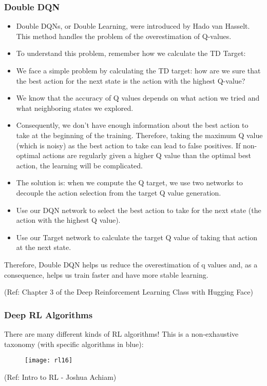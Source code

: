 \begin{frame}[fragile]\frametitle{Double DQN}


\begin{itemize}
\item Double DQNs, or Double Learning, were introduced by Hado van Hasselt. This method handles the problem of the overestimation of Q-values.
\item To understand this problem, remember how we calculate the TD Target:
\item We face a simple problem by calculating the TD target: how are we sure that the best action for the next state is the action with the highest Q-value?
\item We know that the accuracy of Q values depends on what action we tried and what neighboring states we explored.
\item Consequently, we don’t have enough information about the best action to take at the beginning of the training. Therefore, taking the maximum Q value (which is noisy) as the best action to take can lead to false positives. If non-optimal actions are regularly given a higher Q value than the optimal best action, the learning will be complicated.
\item The solution is: when we compute the Q target, we use two networks to decouple the action selection from the target Q value generation. 
\item Use our DQN network to select the best action to take for the next state (the action with the highest Q value).
\item Use our Target network to calculate the target Q value of taking that action at the next state.
\end{itemize}

Therefore, Double DQN helps us reduce the overestimation of q values and, as a consequence, helps us train faster and have more stable learning.

{\tiny (Ref: Chapter 3 of the Deep Reinforcement Learning Class with Hugging Face)}

\end{frame}




\begin{frame}[fragile]\frametitle{Deep RL Algorithms}

There are many different kinds of RL algorithms! This is a non-exhaustive taxonomy (with specific algorithms in blue):
\begin{figure}
\centering
\texttt{[image: rl16]}
\end{figure}

{\tiny (Ref: Intro to RL - Joshua Achiam)}


\end{frame}

